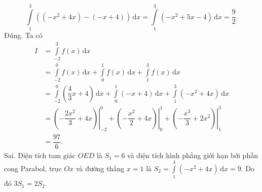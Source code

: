 \begin{ex}
{\begin{itemchoice}
	$$\displaystyle\int\limits_1^3\left((-x^2+4x)-(-x+4)\right)\mathrm{\, d}x=\displaystyle\int\limits_1^3\left(-x^2+5x-4\right)\mathrm{\, d}x=\dfrac{9}{2}.$$
	\itemch Đúng. Ta có
	{\allowdisplaybreaks
	\begin{align*}
	I&=\displaystyle\int\limits_{-2}^3 f(x)\mathrm{\,d}x\\
	&=\displaystyle\int\limits_{-2}^0 f(x)\mathrm{\,d}x+\displaystyle\int\limits_0^1 f(x)\mathrm{\,d}x+\displaystyle\int\limits_1^3 f(x)\mathrm{\,d}x\\
	&=\displaystyle\int\limits_{-2}^0 \left(\dfrac{4}{3}x+4\right)\mathrm{\,d}x+\displaystyle\int\limits_0^1 (-x+4)\mathrm{\,d}x+\displaystyle\int\limits_1^3 (-x^2+4x)\mathrm{\,d}x\\
	&=\left.\left(-\dfrac{2x^2}{3}+4x\right)\right|_{-2}^0+\left.\left(-\dfrac{x^2}{2}+4x\right)\right|_0^1+\left.\left(-\dfrac{x^3}{3}+2x^2\right)\right|_1^3\\
	&=\dfrac{97}{6}.
	\end{align*}}
	\itemch Sai. Diện tích tam giác $OED$ là $S_1=6$ và diện tích hình phẳng giới hạn bởi phần cong Parabol, trục $Ox$ và đường thẳng $x=1$ là $S_2=\displaystyle\int\limits_1^4(-x^2+4x)\mathrm{\, d}x=9$. Do đó $3S_1=2S_2$.
	\end{itemchoice}
	}
\end{ex}
